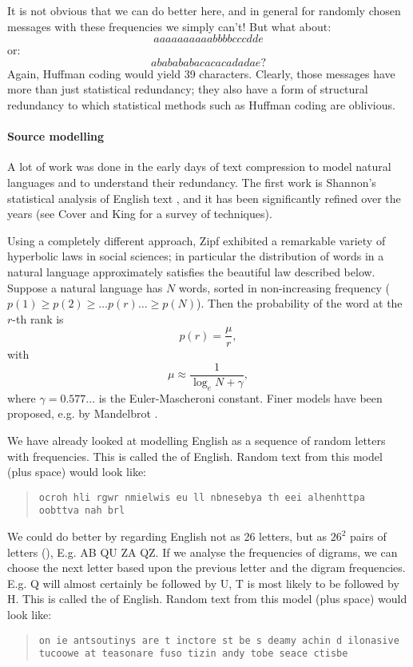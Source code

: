 \documentclass[a4paper, 11pt, openany]{book}
\begin{document}
It is not obvious that we can do better here, and in general for randomly chosen messages with these frequencies we simply can't! But what about:
\[
    aaaaaaaaaabbbbcccdde
\]
or:
\[
    ababababacacacadadae ?
\]
Again, Huffman coding would yield 39 characters. Clearly, those messages have more than just statistical redundancy; they also have a form of structural redundancy to which statistical methods such as Huffman coding are oblivious.





\paragraph{Source modelling}

A lot of work was done in the early days of text compression to model natural languages and to understand their redundancy. The first work is Shannon's statistical analysis of English text \cite{Sha51}, and it has been significantly refined over the years (see Cover and King \cite{CK78} for a survey of techniques).

Using a completely different approach, Zipf \cite{Zip49} exhibited a remarkable variety of hyperbolic laws in social sciences; in particular the distribution of words in a natural language approximately satisfies the beautiful law described below. Suppose a natural language has $N$ words, sorted in non-increasing frequency ($p(1) \ge p(2) \ge \dots p(r) \dots \ge p(N)$). Then the probability of the word at the $r$-th rank is
\[
    p(r) = \frac{ \mu }{ r },
\]
with
\[
    \mu \approx \frac{ 1 }{ \log_e N + \gamma },
\]
where $\gamma = 0.577\dots$ is the Euler-Mascheroni constant. Finer models have been proposed, e.g. by Mandelbrot \cite{Man52}.

We have already looked at modelling English as a sequence of random letters with frequencies. This is called the  of English. Random text from this model (plus space) would look like:
\begin{quote}
    \texttt{ocroh hli rgwr nmielwis eu ll nbnesebya th eei alhenhttpa oobttva nah brl}
\end{quote}



We could do better by regarding English not as 26 letters, but as $26^2$ pairs of letters (), E.g. AB QU ZA QZ. If we analyse the frequencies of digrams, we can choose the next letter based upon the previous letter and the digram frequencies. E.g. Q will almost certainly be followed by U, T is most likely to be followed by H. This is called the  of English.  Random text from this model (plus space) would look like:
\begin{quote}
    \texttt{on ie antsoutinys are t inctore st be s deamy achin d ilonasive tucoowe at teasonare fuso tizin andy tobe seace ctisbe}
\end{quote}
\end{document}

